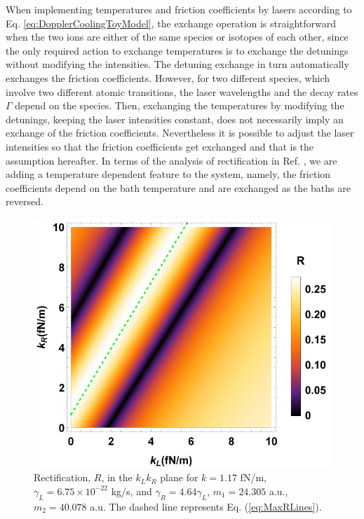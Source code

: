 When implementing temperatures and friction coefficients by lasers according to
Eq. \eqref{eq:DopplerCoolingToyModel}, the exchange operation is straightforward when the two ions are either of the same species or isotopes of each other, since the only required action to exchange temperatures is to exchange the detunings without modifying the intensities. The detuning exchange in turn automatically exchanges the friction coefficients. However, for two different species, which involve two different atomic transitions, the laser wavelengths and the decay rates $\Gamma$ depend on the species. Then, exchanging the temperatures by modifying the detunings, keeping the laser intensities constant, does not necessarily imply an exchange of the friction coefficients. Nevertheless it is possible to adjust the laser intensities so that the friction coefficients get exchanged and that is the assumption hereafter. In terms of the analysis of rectification in Ref. \cite{Pereira2017}, we are adding a temperature dependent feature to the system, namely,  the friction coefficients depend on the bath temperature
and are exchanged as the baths are reversed.

\begin{figure}
  \includegraphics[width=\linewidth]{Figures/RwMPlota.pdf}
  \caption{Rectification, $R$, in the $k_L k_R$ plane for $k = 1.17$ fN/m, $\gamma_L = 6.75\times 10^{-22}$ kg/s, and $\gamma_R = 4.64\gamma_L$, $m_1 = 24.305$ a.u., $m_2 = 40.078$ a.u. The dashed  line represents Eq.  (\ref{eq:MaxRLines}).}
  \label{fig:Fig_rectification_K_plane}
\end{figure}


